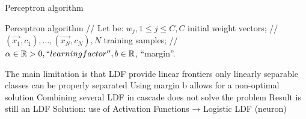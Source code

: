 \begin{algorithm}
   \caption{Perceptron algorithm}\label{euclid}
   \begin{algorithmic}[1]
      \State Perceptron algorithm
      \State // Let be: $w_j , 1 \leq j \leq C, C$ initial weight vectors;
      \State // $(\vec{x_1}, c_1), \dots , (\vec{x_N} , c_N ), N  $ training samples;
      \State // $\alpha \in \mathbb{R}>0, ``learning factor'', b \in \mathbb{R}$, ``margin''.
\end{algorithmic}
\end{algorithm}

The main limitation is that LDF provide linear frontiers only linearly separable classes
can be properly separated
Using margin b allows for a non-optimal solution
Combining several LDF in cascade does not solve the problem
Result is still an LDF
Solution: use of Activation Functions → Logistic LDF (neuron)